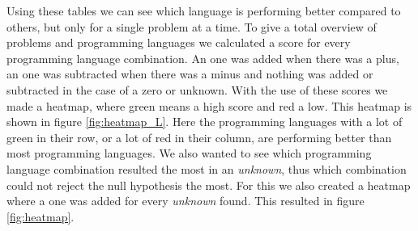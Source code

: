 \begin{table}[h]
\centering
{}
\caption{The comparison of the different languages for the Nbody problem on \textit{node28}. A \textit{+} means that the language on the row has a lower energy consumption then the language on the column, the opposite for \textit{-}, and the \textit{Unknown} means that we could not reject the null hypothesis.}
\label{tab:lang-example}
\end{table}

Using these tables we can see which language is performing better compared to others, but only for a single problem at a time. To give a total overview of problems and programming languages we calculated a score for every programming language combination. An one was added when there was a plus, an one was subtracted when there was a minus and nothing was added or subtracted in the case of a zero or unknown. With the use of these scores we made a heatmap, where green means a high score and red a low. This heatmap is shown in figure \ref{fig:heatmap_L}. Here the programming languages with a lot of green in their row, or a lot of red in their column, are performing better than most programming languages. We also wanted to see which programming language combination resulted the most in an \textit{unknown}, thus which combination could not reject the null hypothesis the most. For this we also created a heatmap where a one was added for every \textit{unknown} found. This resulted in figure \ref{fig:heatmap}.

